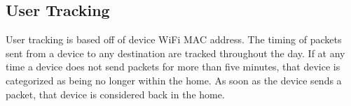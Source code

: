 
\subsection{User Tracking}

User tracking is based off of device WiFi \ac{MAC} address. The timing of packets sent from a device to any destination are tracked throughout the day. If at any time a device does not send packets for more than five minutes, that device is categorized as being no longer within the home. As soon as the device sends a packet, that device is considered back in the home.